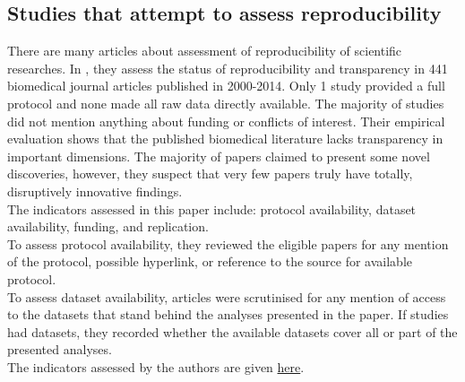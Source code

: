 \documentclass[
10pt, %
a4paper, %
oneside, %
headinclude,footinclude, %
BCOR5mm, %
]{scrartcl}
\begin{document}
\subsection{Studies that attempt to assess reproducibility}
There are many articles about assessment of reproducibility of scientific researches.
In \cite{iqbal2016reproducible}, they assess the status of reproducibility and transparency in 441 biomedical journal articles published in 2000-2014. 
Only 1 study provided a full protocol and none made all raw data directly available. 
The majority of studies did not mention anything about funding or conflicts of interest. 
Their empirical evaluation shows that the published biomedical literature lacks transparency in important dimensions. 
The majority of papers claimed to present some novel discoveries, however, they suspect that very few papers truly have totally, disruptively innovative findings.\\
The indicators assessed in this paper include: protocol availability, dataset availability,  funding, and replication.\\
To assess protocol availability, they reviewed the eligible papers for any mention of the protocol, possible hyperlink, or reference to the source for available protocol.\\
To assess dataset availability, articles were scrutinised for any mention of access to the datasets that stand behind the analyses presented in the paper. If studies had datasets, they recorded whether the available datasets cover all or part of the presented analyses.\\
The indicators assessed by the authors are given
\href{https://www.dropbox.com/home/%5BGroup%201%5DScientific%20Information%20Share/literature_review_Group/Literature%20review%20on%20assessments%20of%20reproducibility/Reproducibility%20data?preview=Paper+1+result.xlsx}{here}.
\end{document}
